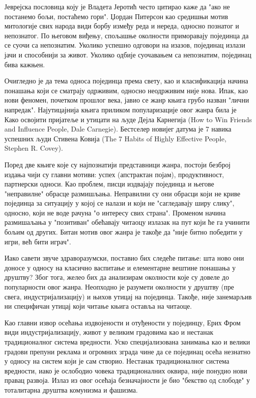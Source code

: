 \documentclass[b5paper]{article}
\begin{document}
\large

Јеврејска пословица коју је Владета Јеротић често цитирао каже да "ако не постанемо бољи, постаћемо гори". Џордан Питерсон као средишњи мотив митологије свих народа види борбу између реда и нереда, односно познатог и непознатог. По његовом виђењу, спољашње околности приморавају појединца да се суочи са непознатим. Уколико успешно одговори на изазов, појединац излази јачи и способнији за живот. Уколико одбије суочавањем са непознатим, појединац бива кажњен.

Очигледно је да тема односа појединца према свету, као и класификација начина понашања који се сматрају одрживим, односно неодрживим није нова. Ипак, као нови феномен, почетком прошлог века, јавио се жанр књига грубо назван "лични напредак". Најутицајнија књига приликом популаризације овог жанра била је Како освојити пријатеље и утицати на људе Дејла Карнегија (How to Win Friends and Influence People, Dale Carnegie). Бестселер новијег датума је 7 навика успешних људи Стивена Ковија (The 7 Habits of Highly Effective People, Stephen R. Covey).

Поред две књиге које су најпознатији представници жанра, постоји безброј издања чији су главни мотиви: успех (апстрактан појам), продуктивност, партнерски односи. Као проблем, писци издвајају појединца и његове "неправилне" обрасце размишљања. Неправилни су они обрасци који не криве појединца за ситуацију у којој се налази и који не "сагледавају ширу слику", односно, који не воде рачуна "о интересу свих страна". Променом начина размишаљања у "позитиван" обећавају читаоцу излазак на пут који ће га учинити бољим од других. Битан мотив овог жанра је такође да "није битно победити у игри, већ бити играч".

Иако савети звуче здраворазумски, поставио бих следеће питање: шта ново они доносе у односу на класично васпитање и елементарне вештине понашања у друштву? Због тога, желео бих да анализирам околности које су довеле до популарности овог жанра. Неопходно је разумети околности у друштву (пре свега, индустријализацију) и њихов утицај на појединца. Такође, није занемарљив ни специфичан утицај који читање књига оставља на читаоце.

Као главни извор осећања издвојености и отуђености у појединцу, Ерих Фром види индустријализацију, живот у великим градовима као и нестанак традиционалног система вредности. Уско специјализована занимања као и велики градови препуни реклама и огромних зграда чине да се појединац осећа незнатно у односу на систем који је сам створио. Нестанак традиционалног система вредности, иако је ослободио човека традиционалних оквира, није понудио нови правац развоја. Излаз из овог осећаја безначајности је био "бекство од слободе" у тоталитарна друштва комунизма и фашизма. 
\end{document}

